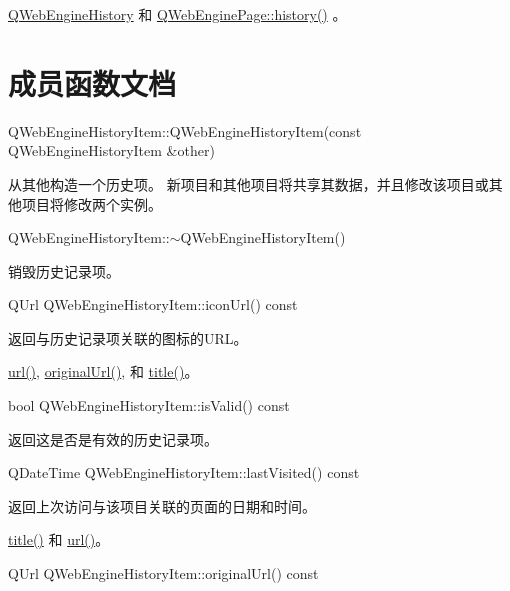 \begin{notice}[另请参阅]
 \href{https://github.com/QtDocumentCN/QtDocumentCN/blob/master/Src/W/QWebEngineHistoryItem/qwebenginehistory.html}{QWebEngineHistory} 和 \href{https://github.com/QtDocumentCN/QtDocumentCN/blob/master/Src/W/QWebEngineHistoryItem/qwebenginepage.html#history}{QWebEnginePage::history()} 。
\end{notice}


\section{成员函数文档}

QWebEngineHistoryItem::QWebEngineHistoryItem(const QWebEngineHistoryItem \&other)

从其他构造一个历史项。 新项目和其他项目将共享其数据，并且修改该项目或其他项目将修改两个实例。

QWebEngineHistoryItem::$\sim$QWebEngineHistoryItem()

销毁历史记录项。

QUrl QWebEngineHistoryItem::iconUrl() const

返回与历史记录项关联的图标的URL。

\begin{notice}[另请参阅]
	\href{https://github.com/QtDocumentCN/QtDocumentCN/blob/master/Src/W/QWebEngineHistoryItem/qwebenginehistoryitem.html#url}{url()}, \href{https://github.com/QtDocumentCN/QtDocumentCN/blob/master/Src/W/QWebEngineHistoryItem/qwebenginehistoryitem.html#originalUrl}{originalUrl()}, 和 \href{https://github.com/QtDocumentCN/QtDocumentCN/blob/master/Src/W/QWebEngineHistoryItem/qwebenginehistoryitem.html#title}{title()}。
\end{notice}


bool QWebEngineHistoryItem::isValid() const

返回这是否是有效的历史记录项。

QDateTime QWebEngineHistoryItem::lastVisited() const

返回上次访问与该项目关联的页面的日期和时间。

\begin{notice}[另请参阅]
\href{https://github.com/QtDocumentCN/QtDocumentCN/blob/master/Src/W/QWebEngineHistoryItem/qwebenginehistoryitem.html#title}{title()} 和 \href{https://github.com/QtDocumentCN/QtDocumentCN/blob/master/Src/W/QWebEngineHistoryItem/qwebenginehistoryitem.html#url}{url()}。
\end{notice}

QUrl QWebEngineHistoryItem::originalUrl() const

